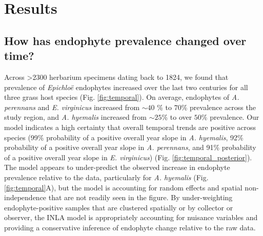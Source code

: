 \documentclass[11pt]{article}
\begin{document}
\section*{Results}
\subsection*{How has endophyte prevalence changed over time?}
Across >2300 herbarium specimens dating back to 1824, we found that prevalence of \emph{Epichloë} endophytes increased over the last two centuries for all three grass host species (Fig. \ref{fig:temporal}). 
On average, endophytes of \emph{A. perennans} and \emph{E. virginicus} increased from $\sim 40$ \% to  $70$\% prevalence across the study region, and \emph{A. hyemalis} increased from $\sim 25$\% to over $50$\% prevalence.
Our model indicates a high certainty that overall temporal trends are positive across species (99\% probability of a positive overall year slope in \emph{A. hyemalis}, 92\% probability of a positive overall year slope in \emph{A. perennans}, and 91\% probability of a positive overall year slope in \emph{E. virginicus}) (Fig. \ref{fig:temporal_posterior}). 
The model appears to under-predict the observed increase in endophyte prevalence relative to the data, particularly for \emph{A. hyemalis} (Fig. \ref{fig:temporal}A), but the model is accounting for random effects and spatial non-independence that are not readily seen in the figure. 
By under-weighting endophyte-positive samples that are clustered spatially or by collector or observer, the INLA model is appropriately accounting for nuisance variables and providing a conservative inference of endophyte change relative to the raw data. 
\end{document}
